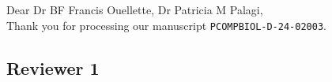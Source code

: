 \documentclass[a4paper]{article}
\newcommand{\editor}{Dr BF Francis Ouellette, Dr Patricia M Palagi}
\begin{document}
\noindent Dear \editor,\\

Thank you for processing our manuscript \texttt{PCOMPBIOL-D-24-02003}.


\subsection*{Reviewer 1}
\end{document}
